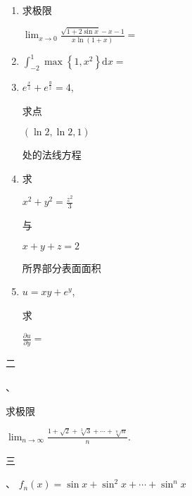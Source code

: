 \documentclass[10pt]{article}
\begin{document}
\begin{enumerate}
  \item \begin{CJK}{UTF8}{mj}求极限\end{CJK} $\lim _{x \rightarrow 0} \frac{\sqrt{1+2 \sin x}-x-1}{x \ln (1+x)}=$

  \item $\int_{-2}^{1} \max \left\{1, x^{2}\right\} \mathrm{d} x=$

  \item $e^{\frac{x}{z}}+e^{\frac{y}{z}}=4$, \begin{CJK}{UTF8}{mj}求点\end{CJK} $(\ln 2, \ln 2,1)$ \begin{CJK}{UTF8}{mj}处的法线方程\end{CJK}

  \item \begin{CJK}{UTF8}{mj}求\end{CJK} $x^{2}+y^{2}=\frac{z^{2}}{3}$ \begin{CJK}{UTF8}{mj}与\end{CJK} $x+y+z=2$ \begin{CJK}{UTF8}{mj}所界部分表面面积\end{CJK}

  \item $u=x y+e^{y}$, \begin{CJK}{UTF8}{mj}求\end{CJK} $\frac{\partial u}{\partial y}=$

\end{enumerate}
\begin{CJK}{UTF8}{mj}二\end{CJK}、 \begin{CJK}{UTF8}{mj}求极限\end{CJK} $\lim _{n \rightarrow \infty} \frac{1+\sqrt{2}+\sqrt[3]{3}+\cdots+\sqrt[n]{n}}{n}$.

\begin{CJK}{UTF8}{mj}三\end{CJK}、 $f_{n}(x)=\sin x+\sin ^{2} x+\cdots+\sin ^{n} x$
\end{document}
